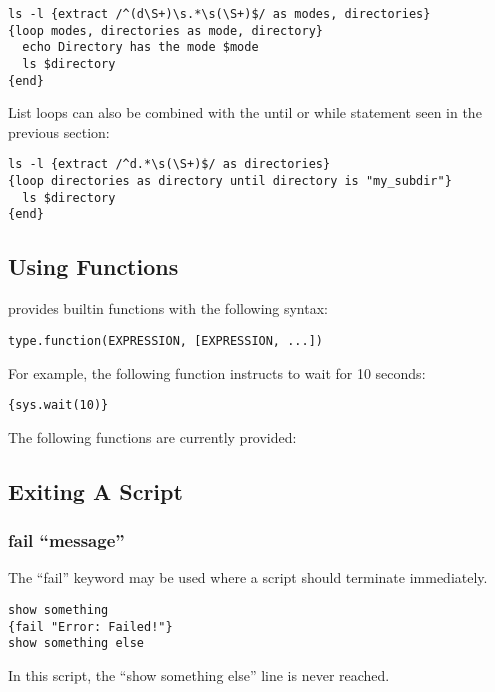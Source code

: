 \begin{lstlisting}
ls -l {extract /^(d\S+)\s.*\s(\S+)$/ as modes, directories}
{loop modes, directories as mode, directory}
  echo Directory has the mode $mode
  ls $directory
{end}
\end{lstlisting}

List loops can also be combined with the until or while statement seen in 
the previous section: 

\begin{lstlisting}
ls -l {extract /^d.*\s(\S+)$/ as directories}
{loop directories as directory until directory is "my_subdir"}
  ls $directory
{end}
\end{lstlisting}


\subsection{Using Functions}

\product provides builtin functions with the following syntax: 

\begin{lstlisting}
type.function(EXPRESSION, [EXPRESSION, ...])
\end{lstlisting}

For example, the following function instructs \product to wait for 10 seconds: 

\begin{lstlisting}
{sys.wait(10)}
\end{lstlisting}

The following functions are currently provided: 




\subsection{Exiting A Script}

\subsubsection{fail ``message''}

The ``fail'' keyword may be used where a script should terminate immediately. 

\begin{lstlisting}
show something
{fail "Error: Failed!"}
show something else
\end{lstlisting}

In this script, the ``show something else'' line is never reached. 

